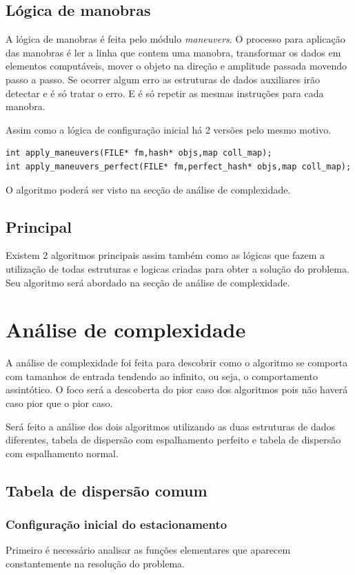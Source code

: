 \documentclass[11pt]{article}
\begin{document}
\subsection{Lógica de manobras}
\label{sec:org8776994}
A lógica de manobras é feita pelo módulo \emph{maneuvers}. 
O processo para aplicação das manobras é ler a linha que contem uma manobra, transformar os dados em elementos computáveis, mover o objeto na direção e amplitude passada movendo passo a passo. Se ocorrer algum erro as estruturas de dados auxiliares irão detectar e é só tratar o erro. E é só repetir as mesmas instruções para cada manobra.

Assim como a lógica de configuração inicial há 2 versões pelo mesmo motivo.
\begin{verbatim}
int apply_maneuvers(FILE* fm,hash* objs,map coll_map);
int apply_maneuvers_perfect(FILE* fm,perfect_hash* objs,map coll_map);
\end{verbatim}
O algoritmo poderá ser visto na secção de análise de complexidade.
\subsection{Principal}
\label{sec:org6269069}
  Existem 2 algoritmos principais assim também como as lógicas que fazem a utilização de todas estruturas e logicas criadas para obter a solução do problema.
Seu algoritmo será abordado na secção de análise de complexidade.
\section{Análise de complexidade}
\label{sec:org96a5f91}
A análise de complexidade foi feita para descobrir como o algoritmo se comporta com tamanhos de entrada tendendo ao infinito, ou seja, o comportamento assintótico. O foco será a descoberta do pior caso dos algoritmos pois não haverá caso pior que o pior caso.


\bigskip
  Será feito a análise dos dois algoritmos utilizando as duas estruturas de dados diferentes, tabela de dispersão com espalhamento perfeito e tabela de dispersão com espalhamento normal.

\subsection{Tabela de dispersão comum}
\label{sec:orge41286b}
\subsubsection{Configuração inicial do estacionamento}
\label{sec:org7eb7fd2}
Primeiro é necessário analisar as funções elementares que aparecem constantemente na resolução do problema.
\end{document}
